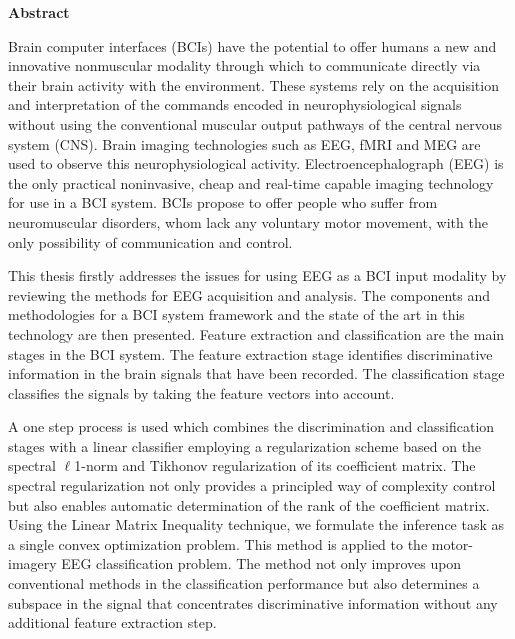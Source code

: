 % 
% 
%
\begin{center}{\large{\bf {Abstract}}}
\end{center}
\noindent
Brain computer interfaces (BCIs) have the potential to offer humans a new and innovative nonmuscular modality through which to communicate directly via their brain activity with the environment. These systems rely on the acquisition and interpretation of the commands encoded in neurophysiological signals without using the conventional muscular output pathways of the central nervous system (CNS). Brain imaging technologies such as EEG, fMRI and MEG are used to observe this neurophysiological activity. Electroencephalograph (EEG) is the only practical noninvasive, cheap and real-time capable imaging technology for use in a BCI system. BCIs propose to offer people who suffer from neuromuscular disorders, whom lack any voluntary motor movement, with the only possibility of communication and control.
              
This thesis firstly addresses the issues for using EEG as a BCI input modality by reviewing the methods for EEG acquisition and analysis. The components and methodologies for a BCI system framework and the state of the art in this technology are then presented. Feature extraction and classification are the main stages in the BCI system. The feature extraction stage identifies discriminative information in the brain signals that have been recorded. The classification stage classifies the signals by taking the feature vectors into account.

A one step process is used which combines the discrimination and classification stages with a linear classifier employing a regularization scheme based on the spectral $\ell $1-norm and Tikhonov regularization of its coefficient matrix. The spectral regularization not only provides a principled way of complexity control but also enables automatic determination of the rank of the coefficient matrix. Using the Linear Matrix Inequality technique, we formulate the inference task as a single convex optimization problem. This method is applied to the motor-imagery EEG classification problem. The method not only improves upon conventional methods in the classification performance but also determines a subspace in the signal that concentrates discriminative information without any additional feature extraction step.



